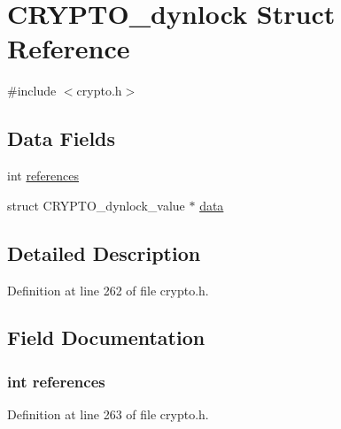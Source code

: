 \hypertarget{struct_c_r_y_p_t_o__dynlock}{}\section{C\+R\+Y\+P\+T\+O\+\_\+dynlock Struct Reference}
\label{struct_c_r_y_p_t_o__dynlock}


{\ttfamily \#include $<$crypto.\+h$>$}

\subsection*{Data Fields}
\begin{DoxyCompactItemize}
\item 
int \hyperlink{struct_c_r_y_p_t_o__dynlock_a146fdb34d9a909e530adf8b189481195}{references}
\item 
struct C\+R\+Y\+P\+T\+O\+\_\+dynlock\+\_\+value $\ast$ \hyperlink{struct_c_r_y_p_t_o__dynlock_a50d3bc271091107e90b4b18b9c8f380e}{data}
\end{DoxyCompactItemize}


\subsection{Detailed Description}


Definition at line 262 of file crypto.\+h.



\subsection{Field Documentation}
\subsubsection[{\texorpdfstring{references}{references}}]{\setlength{\rightskip}{0pt plus 5cm}int references}\hypertarget{struct_c_r_y_p_t_o__dynlock_a146fdb34d9a909e530adf8b189481195}{}\label{struct_c_r_y_p_t_o__dynlock_a146fdb34d9a909e530adf8b189481195}


Definition at line 263 of file crypto.\+h.

